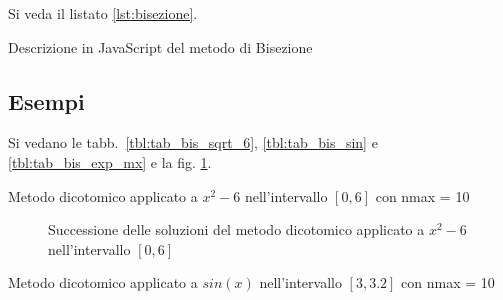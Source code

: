 Si veda il listato \ref{lst:bisezione}.

\begin{lstfloat}
    
    \caption{Descrizione in JavaScript del metodo di Bisezione}
    \label{lst:bisezione}
\end{lstfloat}

\subsection{Esempi}

Si vedano le tabb.~\ref{tbl:tab_bis_sqrt_6}, \ref{tbl:tab_bis_sin} e \ref{tbl:tab_bis_exp_mx} e la fig. \ref{fig:bis_sqrt_6}.

\begin{table}
    \begin{center}
\end{center}        
\caption[]{Metodo dicotomico applicato a $x^2 -6$ nell'intervallo $[0, 6]$ con nmax = 10}
\label{tbl:tab_bis_sqrt_6}
\end{table}

\begin{figure}[ht]
    \centering
    
    \caption{Successione delle soluzioni del metodo dicotomico applicato a $x^2 -6$ nell'intervallo $[0, 6]$}
    \label{fig:bis_sqrt_6}
\end{figure}

\begin{table}
    \begin{center}
    \end{center}        
    \caption{Metodo dicotomico applicato a $sin(x)$ nell'intervallo $[3, 3.2]$ con nmax = 10}
    \label{tbl:tab_bis_sin}
\end{table}

